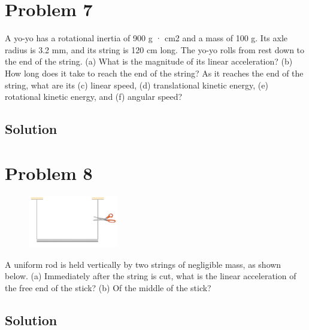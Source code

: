 \documentclass[12pt]{article}
\begin{document}
\pagebreak

\section{Problem 7}
A yo-yo has a rotational inertia of 900 g · cm2 and a mass of 100 g. Its axle radius is 3.2 mm, and its string is 120 cm long. The yo-yo rolls from rest down to the end of the string. (a) What is the magnitude of its linear acceleration? (b) How long does it take to reach the end of the string? As it reaches the end of the string, what are its (c) linear speed, (d) translational kinetic energy, (e) rotational kinetic energy, and (f) angular speed?

\subsection{Solution}


\pagebreak

\section{Problem 8}
\begin{figure}
    \vspace{-30pt}
    \includegraphics[width=0.35\textwidth]{graph_8.png} 
\end{figure}
A uniform rod is held vertically by two strings of negligible mass, as shown below. (a) Immediately after the string is cut, what is the linear acceleration of the free end of the stick? (b) Of the middle of the stick?

\subsection{Solution}
\end{document}

